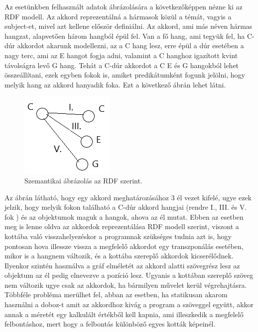 Az esetünkben felhasznált adatok ábrázolására a következőképpen nézne ki az RDF modell. Az akkord reprezentálná a hármasok közül a témát, vagyis a subject-et, mivel azt kellene először definiálni. Az akkord, ami más néven hármas hangzat, alapvetően három hangból épül fel. Van a fő hang, ami tegyük fel, ha C-dúr akkordot akarunk modellezni, az a C hang lesz, erre épül a dúr esetében a nagy terc, ami az E hangot fogja adni, valamint a C hanghoz igazított kvint távolságra levő G hang. Tehát a C-dúr akkordot a C E és G hangokból lehet összeállítani, ezek egyben fokok is, amiket predikátumként fogunk jelölni, hogy melyik hang az akkord hanyadik foka. Ezt a következő ábrán lehet látni.
\begin{figure}[h]
	\includegraphics[scale=1]{images/rdf_graph.png}
	\caption{Szemantikai ábrázolás az RDF szerint.}
	\label{fig:graph1}
\end{figure}
Az ábrán látható, hogy egy akkord meghatározásához 3 él vezet kifelé, ugye ezek jelzik, hogy melyik fokon található a C-dúr akkord hangjai (rendre I., III. és V. fok ) és az objektumok maguk a hangok, ahova az él mutat. Ebben az esetben meg is lenne oldva az akkordok reprezentálása RDF modell szerint, viszont a kottába való visszahelyezéskor a programnak szükséges tudnia azt is, hogy pontosan hova illessze vissza a megfelelő akkordot egy transzponálás esetében, mikor is a hangnem változik, és a kottába szereplő akkordok kicserélődnek. 
Ilyenkor szintén használva a gráf elméletét az akkord alatti szövegrész lesz az objektum az él pedig elnevezve a pozíció lesz. Ugyanis a kottában szereplő szöveg nem változik ugye csak az akkordok, ha bármilyen művelet kerül végrehajtásra. Többféle probléma merülhet fel, abban az esetben, ha statikusan akarom használni a doboz-t amit az akkordhoz kivág a program a szöveggel együtt, akkor annak a méretét egy kalkulált értékből kell kapnia, ami illeszkedik a megfelelő felbontáshoz, mert hogy a felbontás különböző egyes kották képeinél.

